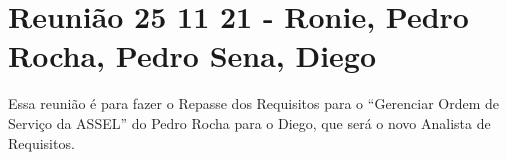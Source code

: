 \section{Reunião 25 11 21 - Ronie, Pedro Rocha, Pedro Sena, Diego}

Essa reunião é para fazer o Repasse dos Requisitos para o ``Gerenciar Ordem de Serviço da ASSEL'' do Pedro Rocha para o Diego, que será o novo Analista de Requisitos.



